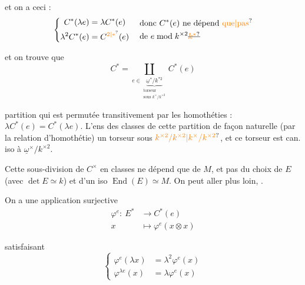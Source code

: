 et on a ceci :
\[
 \left\{\begin{aligned}
 C^*(\lambda e)&=\lambda C^*(e)\\
 \lambda^2 C^*(e)&=C^{\unsure{2|*}}(e)
 \end{aligned}\right.\quad
 \begin{aligned}
 &\text{donc }C^*(e)\ \text{ne dépend \unsure{que|pas}}\\
 &\text{de }e\bmod k^{\times2}\deleted{\unsure{k^*}}
 \end{aligned}
\]

et on trouve que
\[
 C^*=\coprod_{e\in\underbrace{\underline{\omega}^*/k^{*2}}_{\substack{\text{torseur}\\\text{sous }k^\times/k^{\times2}}}}C^*(e)
\]

partition qui est permutée transitivement par les homothéties  :  $\lambda C^*(e)=C^*(\lambda e)$. L'ens des classes de cette partition   de façon naturelle (par la relation d'homothétie) un torseur sous $\unsure{k^{\times2}/k^{\times2}|k^\times/k^{\times2}}$, et ce torseur est can. iso à $\underline{\omega}^\times/k^{\times2}$.

Cette sous-division de $C^\times$ en classes ne dépend que de $M$, et pas du choix de $E$ (avec $\det E\simeq k$) et d'un iso $\operatorname{End}(E)\simeq M$. On peut aller plus loin, .


On  a une application surjective
\[
 \begin{aligned}\varphi^e:\ E^*&\longrightarrow C^*(e)\\
 x&\longmapsto\varphi^e(x\otimes x)\end{aligned}
\]

satisfaisant 
\[
 \left\{\begin{aligned}
 \varphi^e(\lambda x)&=\lambda^2\varphi^e(x)\\
 \varphi^{\lambda e}(x)&=\lambda\varphi^e(x)
 \end{aligned}\right.
\]

